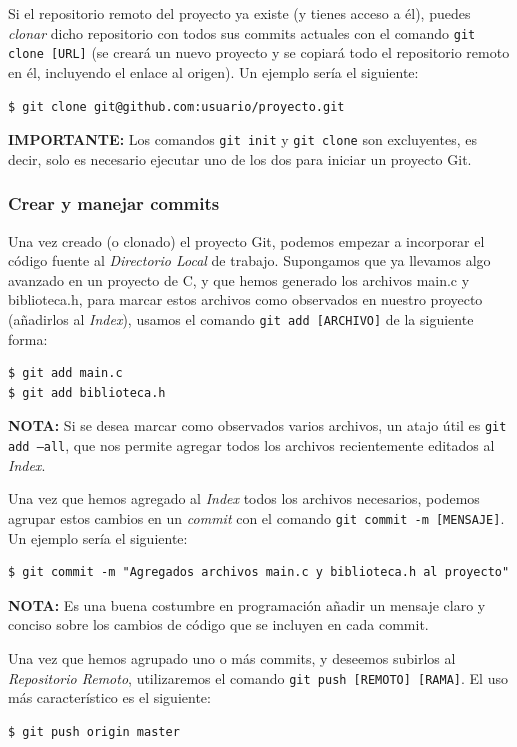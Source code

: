 \documentclass{article}
\begin{document}
Si el repositorio remoto del proyecto ya existe (y tienes acceso a él), puedes \textit{clonar} dicho repositorio con todos sus commits actuales con el comando \texttt{git clone [URL]} (se creará un nuevo proyecto y se copiará todo el repositorio remoto en él, incluyendo el enlace al origen). Un ejemplo sería el siguiente:
\begin{verbatim}
$ git clone git@github.com:usuario/proyecto.git
\end{verbatim}

\noindent \textbf{IMPORTANTE:} Los comandos \texttt{git init} y \texttt{git clone} son excluyentes, es decir, solo es necesario ejecutar uno de los dos para iniciar un proyecto Git.

\subsubsection{Crear y manejar commits}

Una vez creado (o clonado) el proyecto Git, podemos empezar a incorporar el código fuente al \textit{Directorio Local} de trabajo. Supongamos que ya llevamos algo avanzado en un proyecto de C, y que hemos generado los archivos \textsf{main.c} y \textsf{biblioteca.h}, para marcar estos archivos como observados en nuestro proyecto (añadirlos al \textit{Index}), usamos el comando \texttt{git add [ARCHIVO]} de la siguiente forma:
\begin{verbatim}
$ git add main.c
$ git add biblioteca.h
\end{verbatim}

\noindent \textbf{NOTA:} Si se desea marcar como observados varios archivos, un atajo útil es \texttt{git add --all}, que nos permite agregar todos los archivos recientemente editados al \textit{Index}.

Una vez que hemos agregado al \textit{Index} todos los archivos necesarios, podemos agrupar estos cambios en un \textit{commit} con el comando \texttt{git commit -m [MENSAJE]}. Un ejemplo sería el siguiente:
\begin{verbatim}
$ git commit -m "Agregados archivos main.c y biblioteca.h al proyecto"
\end{verbatim}

\noindent \textbf{NOTA:} Es una buena costumbre en programación añadir un mensaje claro y conciso sobre los cambios de código que se incluyen en cada commit.

Una vez que hemos agrupado uno o más commits, y deseemos subirlos al \textit{Repositorio Remoto}, utilizaremos el comando \texttt{git push [REMOTO] [RAMA]}. El uso más característico es el siguiente:
\begin{verbatim}
$ git push origin master
\end{verbatim}
\end{document}
